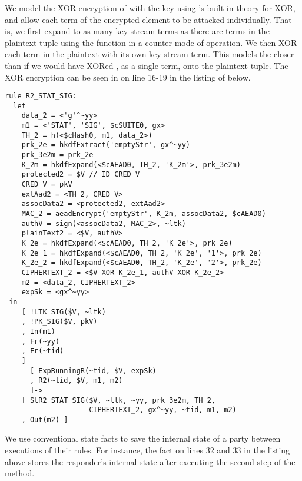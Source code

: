 {%
%
We model the XOR encryption of  with the key  using
\mTamarin{}'s built in theory for XOR, and allow each term of the encrypted
element to be attacked individually.
%
That is, we first expand  to as many key-stream terms as there are
terms in the plaintext tuple using the \mHkdfExpand{} function in a counter-mode
of operation.
%
We then XOR each term in the plaintext with its own key-stream term.
%
This models the \mSpec{} closer than if we would have XORed , as a
single term, onto the plaintext tuple.
%
The XOR encryption can be seen in on line 16-19 in the listing of
 below.
%
\begin{lstlisting}
rule R2_STAT_SIG:
  let
    data_2 = <'g'^~yy>
    m1 = <'STAT', 'SIG', $cSUITE0, gx>
    TH_2 = h(<$cHash0, m1, data_2>)
    prk_2e = hkdfExtract('emptyStr', gx^~yy)
    prk_3e2m = prk_2e
    K_2m = hkdfExpand(<$cAEAD0, TH_2, 'K_2m'>, prk_3e2m)
    protected2 = $V // ID_CRED_V
    CRED_V = pkV
    extAad2 = <TH_2, CRED_V>
    assocData2 = <protected2, extAad2>
    MAC_2 = aeadEncrypt('emptyStr', K_2m, assocData2, $cAEAD0)
    authV = sign(<assocData2, MAC_2>, ~ltk)
    plainText2 = <$V, authV>
    K_2e = hkdfExpand(<$cAEAD0, TH_2, 'K_2e'>, prk_2e)
    K_2e_1 = hkdfExpand(<$cAEAD0, TH_2, 'K_2e', '1'>, prk_2e)
    K_2e_2 = hkdfExpand(<$cAEAD0, TH_2, 'K_2e', '2'>, prk_2e)
    CIPHERTEXT_2 = <$V XOR K_2e_1, authV XOR K_2e_2>
    m2 = <data_2, CIPHERTEXT_2>
    expSk = <gx^~yy>
 in
    [ !LTK_SIG($V, ~ltk)
    , !PK_SIG($V, pkV)
    , In(m1)
    , Fr(~yy)
    , Fr(~tid)
    ]
    --[ ExpRunningR(~tid, $V, expSk)
      , R2(~tid, $V, m1, m2)
      ]->
    [ StR2_STAT_SIG($V, ~ltk, ~yy, prk_3e2m, TH_2,
                    CIPHERTEXT_2, gx^~yy, ~tid, m1, m2)
    , Out(m2) ]
\end{lstlisting}

We use conventional state facts to save the internal state of a party between
executions of their rules.
%
For instance, the fact
 on lines 32 and 33
in the listing above stores the responder's internal state after executing the
second step of the \mStatSig{} method.
%

}
